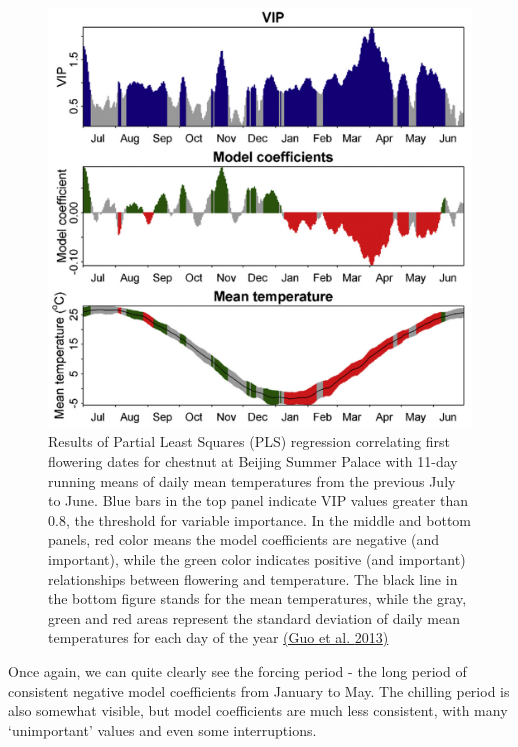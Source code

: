 \documentclass[
]{book}
\begin{document}
\begin{figure}
\centering
\includegraphics{pictures/PLS_chestnut.png}
\caption{Results of Partial Least Squares (PLS) regression correlating first flowering dates for chestnut at Beijing Summer Palace with 11-day running means of daily mean temperatures from the previous July to June. Blue bars in the top panel indicate VIP values greater than 0.8, the threshold for variable importance. In the middle and bottom panels, red color means the model coefficients are negative (and important), while the green color indicates positive (and important) relationships between flowering and temperature. The black line in the bottom figure stands for the mean temperatures, while the gray, green and red areas represent the standard deviation of daily mean temperatures for each day of the year \href{https://www.sciencedirect.com/science/article/abs/pii/S0168192313001627}{(Guo et al. \protect\hyperlink{ref-guo2013response}{2013})}}
\end{figure}

Once again, we can quite clearly see the forcing period - the long period of consistent negative model coefficients from January to May. The chilling period is also somewhat visible, but model coefficients are much less consistent, with many `unimportant' values and even some interruptions.
\end{document}
